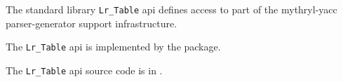 
The standard library {\tt Lr\_Table} api defines access to part of the mythryl-yacc parser-generator support infrastructure.

The {\tt Lr\_Table} api is implemented by the  package.

The {\tt Lr\_Table} api source code is in .






